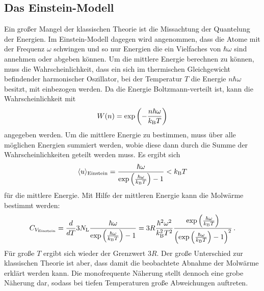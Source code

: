 \subsection{Das Einstein-Modell}
Ein großer Mangel der klassischen Theorie ist die Missachtung der Quantelung der Energien. Im Einstein-Modell dagegen wird angenommen, dass die Atome mit der Frequenz $\omega$ schwingen und so nur Energien die ein Vielfaches von $\hbar\omega$ sind annehmen oder abgeben können.
Um die mittlere Energie berechnen zu können, muss die Wahrscheinlichkeit, dass ein sich im thermischen Gleichgewicht befindender harmonischer Oszillator, bei der Temperatur $T$ die Energie $n\hbar\omega$ besitzt, mit einbezogen werden. Da die Energie Boltzmann-verteilt ist, kann die Wahrscheinlichkeit mit
\begin{equation*}
	W(n) = \exp{\left(-\frac{n\hbar \omega}{k_\text B T}\right)}
\end{equation*}
angegeben werden.
Um die mittlere Energie zu bestimmen, muss über alle möglichen Energien summiert werden, wobie diese dann durch die Summe der Wahrscheinlichkeiten geteilt werden muss.
Es ergibt sich
\begin{equation*}
	\langle u \rangle _\text{Einstein} = \frac{\hbar\omega}{\exp{\left(\frac{\hbar\omega}{k_\text B T}\right)} - 1}  < k_\text B T
\end{equation*}
für die mittlere Energie.
Mit Hilfe der mittleren Energie kann die Molwärme bestimmt werden:
\begin{equation}
	C_{V_\text{Einstein}} = \frac{d}{dT}3 N_\text L \frac{\hbar\omega}{\exp{\left(\frac{\hbar\omega}{k_\text B T}\right)} - 1} = 3R \frac{\hbar^2\omega^2}{k_\text B ^2 T^2} \frac{\exp{\left(\frac{\hbar\omega}{k_\text B T}\right)}}{\left(\exp{\left(\frac{\hbar\omega}{k_\text B T}\right)}-1\right)^2}\,\text.
	\label{eqn:cv}
\end{equation}
Für große $T$ ergibt sich wieder der Grenzwert $3R$.
Der große Unterschied zur klassischen Theorie ist aber, dass damit die beobachtete Abnahme der Molwärme erklärt werden kann.
Die monofrequente Näherung stellt dennoch eine grobe Näherung dar, sodass bei tiefen Temperaturen große Abweichungen auftreten.
